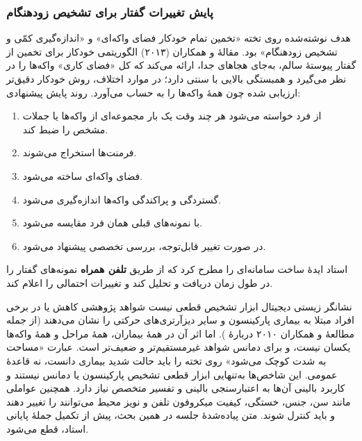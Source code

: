 \subsubsection{پایش تغییرات گفتار برای تشخیص زودهنگام}
هدف نوشته‌شده روی تخته «تخمین تمام خودکار فضای واکه‌ای» و «اندازه‌گیری کمّی و تشخیص زودهنگام» بود. مقالهٔ  و همکاران (۲۰۱۳) الگوریتمی خودکار برای تخمین  از گفتار پیوستهٔ سالم، به‌جای هجاهای جدا، ارائه می‌کند که کل «فضای کاری» واکه‌ها را در نظر می‌گیرد و همبستگی بالایی با  سنتی دارد؛ در موارد اختلاف، روش خودکار دقیق‌تر ارزیابی شده چون همهٔ واکه‌ها را به حساب می‌آورد. روند پایش پیشنهادی:
\begin{enumerate}
  \item از فرد خواسته می‌شود هر چند وقت یک بار مجموعه‌ای از واکه‌ها یا جملات مشخص را ضبط کند.
  \item فرمنت‌ها استخراج می‌شوند.
  \item فضای واکه‌ای ساخته می‌شود.
  \item گستردگی و پراکندگی واکه‌ها اندازه‌گیری می‌شود.
  \item با نمونه‌های قبلی همان فرد مقایسه می‌شود.
  \item در صورت تغییر قابل‌توجه، بررسی تخصصی پیشنهاد می‌شود.
\end{enumerate}
استاد ایدهٔ ساخت سامانه‌ای را مطرح کرد که از طریق \textbf{تلفن همراه} نمونه‌های گفتار را در طول زمان دریافت و تحلیل کند و تغییرات احتمالی را اعلام کند.

\begin{correctionbox}{نشانگر زیستی دیجیتال ابزار تشخیص قطعی نیست}
شواهد پژوهشی کاهش  یا  در برخی افراد مبتلا به بیماری پارکینسون و سایر دیزآرتری‌های حرکتی را نشان می‌دهند (از جمله مطالعهٔ  و همکاران ۲۰۱۰ دربارهٔ ). اما اثر آن در همهٔ بیماران، همهٔ مراحل و همهٔ واکه‌ها یکسان نیست، و برای دمانس شواهد غیرمستقیم‌تر و ضعیف‌تر است. عبارت «مساحت به شدت کوچک می‌شود» روی تخته را باید حالت شدید بیماری دانست، نه قاعدهٔ عمومی. این شاخص‌ها به‌تنهایی ابزار قطعی تشخیص پارکینسون یا دمانس نیستند و کاربرد بالینی آن‌ها به اعتبارسنجی بالینی و تفسیر متخصص نیاز دارد. همچنین عواملی مانند سن، جنس، خستگی، کیفیت میکروفون تلفن و نویز محیط می‌توانند  را تغییر دهند و باید کنترل شوند. متن پیاده‌شدهٔ جلسه در همین بحث، پیش از تکمیل جملهٔ پایانی استاد، قطع می‌شود.
\end{correctionbox}

